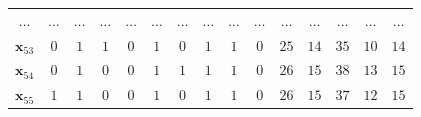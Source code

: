 \begin{table}[!htbp]
\begin{tabular}{ccccccccccccccc}
		$\dots$ & $\dots$     & $\dots$     & $\dots$     & $\dots$     & $\dots$     & $\dots$     & $\dots$     & $\dots$	&	$\dots$	&	$\dots$	&	$\dots$	&	$\dots$	&	$\dots$	&	$\dots$	\\
		$\textbf{x}_{53}$ & $0$     & $1$     & $1$     & $0$     & $1$     & $0$     & $1$     & $1$	&	$0$	&	$25$	&	$14$	&	$35$	&	$10$	&	$14$	\\
		$\textbf{x}_{54}$ & $0$     & $1$     & $0$     & $0$     & $1$     & $1$     & $1$     & $1$	&	$0$	&	$26$	&	$15$	&	$38$	&	$13$	&	$15$	\\
		$\textbf{x}_{55}$ & $1$     & $1$     & $0$     & $0$     & $1$     & $0$     & $1$     & $1$	&	$0$	&	$26$	&	$15$	&	$37$	&	$12$	&	$15$	\\
		\hline
	\end{tabular}
\end{table}

